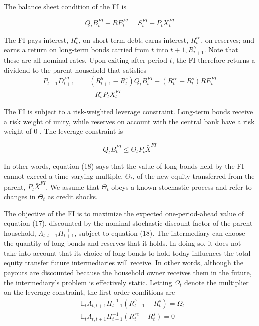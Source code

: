 \documentclass[10pt]{article}
\begin{document}
The balance sheet condition of the FI is

\begin{equation*}
Q_{t} B_{t}^{F I}+R E_{t}^{F I}=S_{t}^{F I}+P_{t} X_{t}^{F I} \tag{16}
\end{equation*}

The FI pays interest, $R_{t}^{s}$, on short-term debt; earns interest, $R_{t}^{r e}$, on reserves; and earns a return on long-term bonds carried from $t$ into $t+1, R_{t+1}^{b}$. Note that these are all nominal rates. Upon exiting after period $t$, the FI therefore returns a dividend to the parent household that satisfies\\
\begin{align*}
P_{t+1} D_{t+1}^{F I}= & \left(R_{t+1}^{b}-R_{t}^{s}\right) Q_{t} B_{t}^{F I}+\left(R_{t}^{r e}-R_{t}^{s}\right) R E_{t}^{F I} \\
& +R_{t}^{s} P_{t} X_{t}^{F I} \tag{17}
\end{align*}

The FI is subject to a risk-weighted leverage constraint. Long-term bonds receive a risk weight of unity, while reserves on account with the central bank have a risk weight of 0 . The leverage constraint is

\begin{equation*}
Q_{t} B_{t}^{F I} \leq \Theta_{t} P_{t} \bar{X}^{F I} \tag{18}
\end{equation*}

In other words, equation (18) says that the value of long bonds held by the FI cannot exceed a time-varying multiple, $\Theta_{t}$, of the new equity transferred from the parent, $P_{t} \bar{X}^{F I}$. We assume that $\Theta_{t}$ obeys a known stochastic process and refer to changes in $\Theta_{t}$ as credit shocks.

The objective of the FI is to maximize the expected one-period-ahead value of equation (17), discounted by the nominal stochastic discount factor of the parent household, $\Lambda_{t, t+1} \Pi_{t+1}^{-1}$, subject to equation (18). The intermediary can choose the quantity of long bonds and reserves that it holds. In doing so, it does not take into account that its choice of long bonds to hold today influences the total equity transfer future intermediaries will receive. In other words, although the payouts are discounted because the household owner receives them in the future, the intermediary's problem is effectively static. Letting $\Omega_{t}$ denote the multiplier on the leverage constraint, the first-order conditions are\\
\begin{align*}
& \mathbb{E}_{t} \Lambda_{t, t+1} \Pi_{t+1}^{-1}\left(R_{t+1}^{b}-R_{t}^{s}\right)=\Omega_{t}  \tag{19}\\
& \mathbb{E}_{t} \Lambda_{t, t+1} \Pi_{t+1}^{-1}\left(R_{t}^{r e}-R_{t}^{s}\right)=0 \tag{20}
\end{align*}
\end{document}
